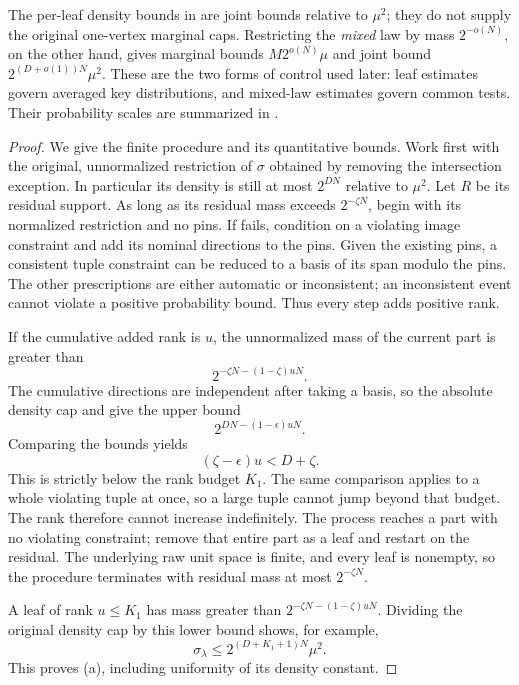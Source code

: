 The per-leaf density bounds in  are joint bounds
relative to \(\mu^2\); they do not supply the original one-vertex
marginal caps. Restricting the \emph{mixed} law by mass \(2^{-o(N)}\),
on the other hand, gives marginal bounds \(M2^{o(N)}\mu\) and joint
bound \(2^{(D+o(1))N}\mu^2\). These are the two forms of control used
later: leaf estimates govern averaged key distributions, and mixed-law
estimates govern common tests. Their probability scales are summarized
in .

\begin{proof}
We give the finite procedure and its quantitative bounds.
Work first with the original, unnormalized restriction of \(\sigma\) obtained by removing the intersection exception.
In particular its density is still at most \(2^{DN}\) relative to \(\mu^2\).
Let \(R\) be its residual support.
As long as its residual mass exceeds \(2^{-\zeta N}\), begin with its normalized restriction and no pins.
If  fails, condition on a violating image constraint and add its nominal directions to the pins.
Given the existing pins, a consistent tuple constraint can be reduced to a basis of its span modulo the pins.
The other prescriptions are either automatic or inconsistent; an inconsistent event cannot violate a positive probability bound.
Thus every step adds positive rank.

If the cumulative added rank is \(u\), the unnormalized mass of the current part is greater than
\[
 2^{-\zeta N-(1-\zeta)uN}.
\]
The cumulative directions are independent after taking a basis, so the absolute density cap and  give the upper bound
\[
 2^{DN-(1-\epsilon)uN}.
\]
Comparing the bounds yields
\begin{equation}\label{eq:peeling-rank-comparison}
 (\zeta-\epsilon)u<D+\zeta.
\end{equation}
This is strictly below the rank budget \(K_1\).
The same comparison applies to a whole violating tuple at once, so a large tuple cannot jump beyond that budget.
The rank therefore cannot increase indefinitely.
The process reaches a part with no violating constraint; remove that entire part as a leaf and restart on the residual.
The underlying raw unit space is finite, and every leaf is nonempty, so the procedure terminates with residual mass at most \(2^{-\zeta N}\).

A leaf of rank \(u\le K_1\) has mass greater than
\(2^{-\zeta N-(1-\zeta)uN}\).
Dividing the original density cap by this lower bound shows, for example,
\[
 \sigma_\lambda\le
 2^{(D+K_1+1)N}\mu^2.
\]
This proves (a), including uniformity of its density constant.


\end{proof}
